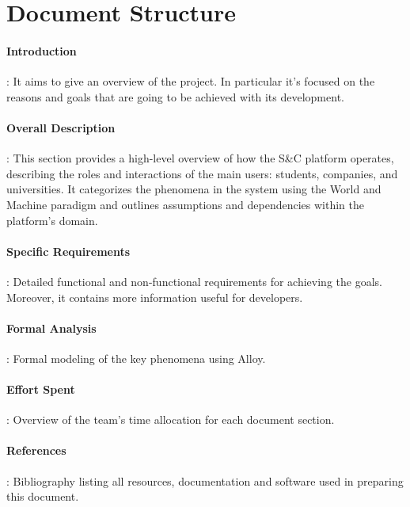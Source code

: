 \section{Document Structure}
\label{sec:document_structure}%

\paragraph{Introduction}: It aims to give an overview of the project. In particular it's focused on the reasons and goals that are going to be
  achieved with its development.
  
\paragraph{Overall Description}: This section provides a high-level overview of how the S\&C platform operates, describing the roles and interactions of the main users: students, companies, and universities. It categorizes the phenomena in the system using the World and Machine paradigm and outlines assumptions and dependencies within the platform's domain.

\paragraph{Specific Requirements}: Detailed functional and non-functional requirements for achieving the goals. Moreover, it contains more information useful for developers.

\paragraph{Formal Analysis}: Formal modeling of the key phenomena using Alloy.

\paragraph{Effort Spent}: Overview of the team's time allocation for each document section.

\paragraph{References}: Bibliography listing all resources, documentation and software used in preparing this document.